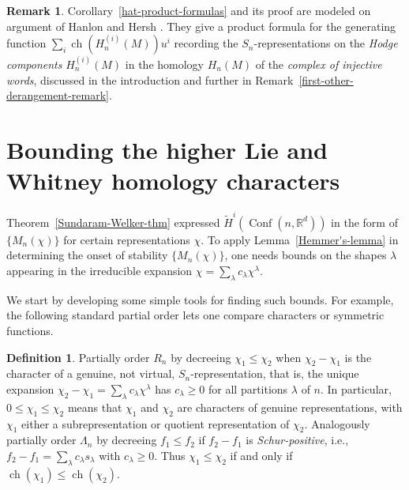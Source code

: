 \documentclass[12pt]{amsart}
\theoremstyle{plain}
\theoremstyle{definition}
\newtheorem{defn}[thm]{Definition}
\newtheorem{remark}[thm]{Remark}
\begin{document}
\begin{remark}
Corollary~\ref{hat-product-formulas} and its proof 
are modeled on argument of Hanlon and Hersh \cite[pp. 118-119]{Hanlon-Hersh2}.
They give a product formula for the generating function
$\sum_i {{\operatorname{ch}}}(H_n^{(i)}(M)) u^i$ recording the 
$S_n$-representations on the
{\it Hodge components} $H_n^{(i)}(M)$ in the
homology $H_n(M)$ of the {\it complex of injective words},
discussed in the introduction and further in
Remark~\ref{first-other-derangement-remark}.
\end{remark}

 

\section{Bounding the higher Lie and 
Whitney homology characters}
\label{bounding-characters-section}

Theorem~\ref{Sundaram-Welker-thm} 
expressed $\tilde{H}^i({{\operatorname{Conf}}}(n,{{\mathbb{R}}}^d))$
in the form of $\{ M_n(\chi) \}$ for certain representations $\chi$.
To apply Lemma~\ref{Hemmer's-lemma} in determining the
onset of stability $\{ M_n(\chi) \}$, one needs bounds
on the shapes $\lambda$ appearing in the 
irreducible expansion $\chi=\sum_\lambda c_\lambda \chi^\lambda$.

We start by developing some simple tools for finding such bounds.
For example, the following standard partial order lets one compare characters
or symmetric functions.

\begin{defn}
Partially order $R_n$ by decreeing $\chi_1 \leq \chi_2$ when
$\chi_2 - \chi_1$ is the character of a genuine, not virtual, 
$S_n$-representation,
that is, the unique expansion $\chi_2-\chi_1 = \sum_{\lambda} c_\lambda \chi^\lambda$
has $c_\lambda \geq 0$ for all partitions $\lambda$ of $n$.
In particular, $0 \leq \chi_1 \leq \chi_2$ means that  $\chi_1$ and $\chi_2$ 
are characters of genuine representations, with $\chi_1$ 
either a subrepresentation or quotient representation of $\chi_2$.
Analogously partially order $\Lambda_n$ by decreeing $f_1 \leq f_2$ 
if $f_2-f_1$ is {\it Schur-positive}, i.e.,
$f_2-f_1=\sum_{\lambda} c_\lambda s_\lambda$ with $c_\lambda \geq 0$.
Thus $\chi_1 \leq \chi_2$ if and only if ${{\operatorname{ch}}}(\chi_1) \leq {{\operatorname{ch}}}(\chi_2)$.
\end{defn}
\end{document}

